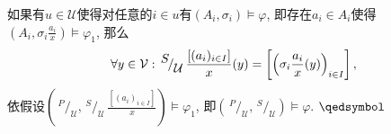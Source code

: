 \documentclass[UTF8]{ctexart}
\begin{document}
\begin{enumerate}
    \vspace{3pt}\hspace{2.17em}
    如果有$u\in\mathcal{U}$使得对任意的$i\in u$有$(A_i,\sigma_i)\models\varphi$,
    即存在$a_i\in A_i$使得
    $\left(A_i,\sigma_i\displaystyle\frac{a_i}{x}\right)\models\varphi_1$, 那么
    \vspace{3pt}
    \[
        \forall y\in\mathcal{V}:\,^{\displaystyle S}
        \!/_{\displaystyle\mathcal{U}}\,\displaystyle\frac{[(a_i)_{i\in I}]}{x}(y)
        =\left[\left(\sigma_i\frac{a_i}{x}(y)\right)_{i\in I}\right],\\[3pt]
    \]
    依假设$\left(\,^{\displaystyle P}\!/_{\displaystyle\mathcal{U}},\,
    ^{\displaystyle S}\!/_{\displaystyle\mathcal{U}}\,
    \displaystyle\frac{[(a_i)_{i\in I}]}{x}\right)\models\varphi_1$,
    即$\left(\,^{\displaystyle P}\!/_{\displaystyle\mathcal{U}},\,
    ^{\displaystyle S}\!/_{\displaystyle\mathcal{U}}\right)\models\varphi$.
    \hfill $\qedsymbol$
\end{enumerate}
\end{document}
